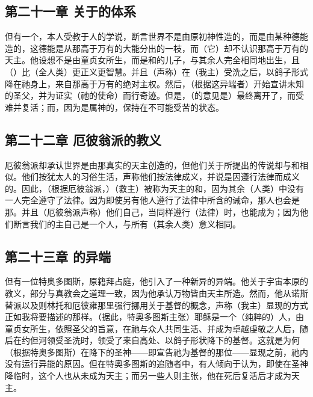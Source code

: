 
\subsection{第二十一章 关于的体系}

但有一个，本人受教于人的学说，断言世界不是由原初神性造的，而是由某种德能造的，这德能是从那高于万有的大能分出的一枝，而（它）却不认识那高于万有的天主。他设想不是由童贞女所生，而是和的儿子，与其余人完全相同地出生，且（）比（全人类）更正义更智慧。并且（声称）在（我主）受洗之后，以鸽子形式降在祂身上，来自那高于万有的绝对主权。然后，（根据这异端者）开始宣讲未知的圣父，并为证实（祂的使命）而行奇迹。但是，（的意见是）最终离开了，而受难并复活；而，因为是属神的，保持在不可能受苦的状态。\par


\subsection{第二十二章 厄彼翁派的教义}

厄彼翁派却承认世界是由那真实的天主创造的，但他们关于所提出的传说却与和相似。他们按犹太人的习俗生活，声称他们按法律成义，并说是因遵行法律而成义的。因此，（根据厄彼翁派，）（救主）被称为天主的和，因为其余（人类）中没有一人完全遵守了法律。因为即使另有他人遵行了法律中所含的诫命，那人也会是那。并且（厄彼翁派声称）他们自己，当同样遵行（法律）时，也能成为；因为他们断言我们的主自己是一个人，与所有（其余人类）意义相同。\par


\subsection{第二十三章 的异端}

但有一位特奥多图斯，原籍拜占庭，他引入了一种新异的异端。他关于宇宙本原的教义，部分与真教会之道理一致，因为他承认万物皆由天主所造。然而，他从诺斯替派以及则林托和厄彼雍那里强行挪用关于基督的概念，声称（我主）显现的方式正如我将要描述的那样。（据此，特奥多图斯主张）耶稣是一个（纯粹的）人，由童贞女所生，依照圣父的旨意，在祂与众人共同生活、并成为卓越虔敬之人后，随后在约但河领受圣洗时，领受了来自高处、以鸽子形状降下的基督。这就是为何（根据特奥多图斯）在降下的圣神——即宣告祂为基督的那位——显现之前，祂内没有运行异能的原因。但在特奥多图斯的追随者中，有人倾向于认为，即使在圣神降临时，这个人也从未成为天主；而另一些人则主张，他在死后复活后才成为天主。\par

